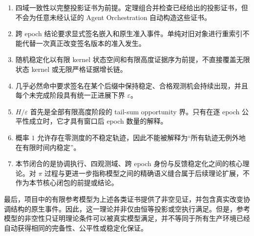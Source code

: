     \begin{enumerate}
      \item 四域一致性以完整投影证书为前提。定理组合并检查已经给出的投影证书，但不会为任意未经认证的 Agent Orchestration 自动构造这些证书。

      \item 跨 epoch 结论要求显式签名嵌入和原生准入事件。单纯对旧对象进行重索引不能代替一次真正改变签名版本的准入发生。

      \item 随机稳定化以有限 kernel 状态空间和有限高度证据序为前提，不直接覆盖无限状态 kernel 或无限严格证据增长链。

      \item 几乎必然命中要求签名在某个后缀中保持稳定、合格观测机会持续出现，并且每个未完成阶段具有统一正进展下界 $\varepsilon$。

      \item $H/\varepsilon$ 首先是全部有限高度阶段的 tail-sum opportunity 界。只有在逐 epoch 公平性成立时，它才具有窗口后 epoch 数量的解释。

      \item 概率 $1$ 允许存在零测度的不稳定轨迹，因此不能被解释为“所有轨迹无例外地在有限时间内稳定”。

      \item 本节闭合的是协调执行、四观测域、跨 epoch 身份与反馈稳定化之间的核心理论。对 $\pi$ 过程与更进一步指称模型之间的精确语义缝合属于后续理论扩展，不作为本节核心闭包的前提或结论。
    \end{enumerate}

    最后，项目中的有限参考模型为上述各类证书提供了非空见证，并包含真实改变协调结构的原生事件。因此，这一理论并非仅由恒等投影或空执行满足。但是，参考模型的非空性只证明理论条件可以被真实模型满足，并不等同于所有生产环境已经自动获得相同的完备性、公平性或稳定化保证。

